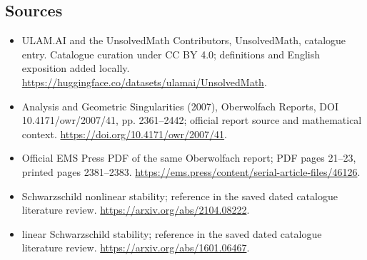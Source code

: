 \documentclass[11pt]{article}
\begin{document}
\subsection{Sources}
\begin{itemize}
\item[\hypertarget{source:statement:1}{S1}] ULAM.AI and the UnsolvedMath Contributors, UnsolvedMath, catalogue entry. Catalogue curation under CC BY 4.0; definitions and English exposition added locally.
\url{https://huggingface.co/datasets/ulamai/UnsolvedMath}.
\item[\hypertarget{source:statement:2}{S2}] Analysis and Geometric Singularities (2007), Oberwolfach Reports, DOI 10.4171/owr/2007/41, pp. 2361--2442; official report source and mathematical context.
\url{https://doi.org/10.4171/owr/2007/41}.
\item[\hypertarget{source:statement:3}{S3}] Official EMS Press PDF of the same Oberwolfach report; PDF pages 21--23, printed pages 2381--2383.
\url{https://ems.press/content/serial-article-files/46126}.
\item[\hypertarget{source:statement:4}{S4}] Schwarzschild nonlinear stability; reference in the saved dated catalogue literature review.
\url{https://arxiv.org/abs/2104.08222}.
\item[\hypertarget{source:statement:5}{S5}] linear Schwarzschild stability; reference in the saved dated catalogue literature review.
\url{https://arxiv.org/abs/1601.06467}.
\end{itemize}
\label{end:statement}
\end{document}

